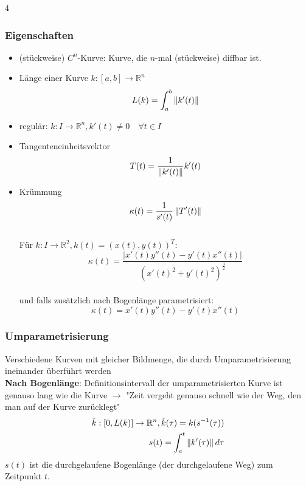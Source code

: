 \documentclass[6pt,a4paper]{scrartcl}
\newcommand{\abs}[1]{\ensuremath{\left\vert#1\right\vert}}
\newcommand{\norm}[2][\relax]{\ifx#1\relax \ensuremath{\left\Vert#2\right\Vert}\else \ensuremath{\left\Vert#2\right\Vert_{#1}}\fi}
\begin{document}
\begin{multicols*}{4}
\begin{sectionbox}
		\subsubsection{Eigenschaften}
		\begin{itemize}
			\item (stückweise) $C^n$-Kurve: Kurve, die $n$-mal (stückweise) diffbar ist.
			\item Länge einer Kurve $k:[a,b] \rightarrow \mathbb R^n$\\
			      \begin{equation*}
				      L(k)=\int_{a}^{b}\norm{k'(t)}
			      \end{equation*}
			\item regulär: $k:I\rightarrow \mathbb R^n, k'(t) \ne 0 \quad \forall t \in I$
			\item Tangenteneinheitsvektor \\
			      \begin{equation*}
				      T(t)=\frac{1}{\norm{k'(t)}}k'(t)
			      \end{equation*}
			\item Krümmung \\
			      \begin{equation*}
				      \kappa (t)=\frac{1}{s'(t)}\norm{T'(t)}
			      \end{equation*} \\
			      Für $k:I\rightarrow \mathbb R^2, k(t) = (x(t), y(t))^T$:\\
			      \begin{equation*}
				      \kappa(t)=\frac{\abs{x'(t)y''(t)-y'(t)x''(t)}}{(x'(t)^2+y'(t)^2)^\frac{3}{2}}
			      \end{equation*} \\
			      und falls zusätzlich nach Bogenlänge parametrisiert: \\
			      \begin{equation*}
				      \kappa(t)=x'(t)y''(t)-y'(t)x''(t)
			      \end{equation*}
		\end{itemize}
	\end{sectionbox}

	\begin{sectionbox}
		\subsubsection{Umparametrisierung}
		Verschiedene Kurven mit gleicher Bildmenge, die durch Umparametrisierung ineinander überführt werden\\
		\textbf{Nach Bogenlänge}:
		Definitionsintervall der umparametrisierten Kurve ist genauso lang wie die Kurve $\rightarrow$ "Zeit vergeht genauso schnell wie der Weg, den man auf der Kurve zurücklegt"
		\begin{eqnarray*}
			\tilde{k}:[0,L(k)]\rightarrow \mathbb R^n, \tilde{k}(\tau)=k(s^{-1}(\tau)) \\
			s(t)=\int_{a}^{t}\norm{k'(\tau)}d\tau
		\end{eqnarray*}
		$s(t)$ ist die durchgelaufene Bogenlänge (der durchgelaufene Weg) zum Zeitpunkt $t$.


\end{sectionbox}
\end{multicols*}
\end{document}
